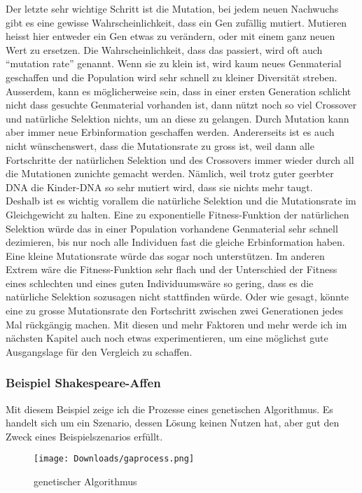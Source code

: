 \documentclass[10pt,a4paper,ngerman,english]{article}
\begin{document}
Der letzte sehr wichtige Schritt ist die Mutation, bei jedem neuen Nachwuchs gibt es eine gewisse Wahrscheinlichkeit, dass ein Gen zufällig mutiert. Mutieren heisst hier entweder ein Gen etwas zu verändern, oder mit einem ganz neuen Wert zu ersetzen. Die Wahrscheinlichkeit, dass das passiert, wird oft auch \enquote{mutation rate} genannt. Wenn sie zu klein ist, wird kaum neues Genmaterial geschaffen und die Population wird sehr schnell zu kleiner Diversität streben. Ausserdem, kann es möglicherweise sein, dass in einer ersten Generation schlicht nicht dass gesuchte Genmaterial vorhanden ist, dann nützt noch so viel Crossover und natürliche Selektion nichts, um an diese zu gelangen. Durch Mutation kann aber immer neue Erbinformation geschaffen werden. Andererseits ist es auch nicht wünschenswert, dass die Mutationsrate zu gross ist, weil dann alle Fortschritte der natürlichen Selektion und des Crossovers immer wieder durch all die Mutationen zunichte gemacht werden. Nämlich, weil trotz guter geerbter DNA die Kinder-DNA so sehr mutiert wird, dass sie nichts mehr taugt.\\

Deshalb ist es wichtig vorallem die natürliche Selektion und die Mutationsrate im Gleichgewicht zu halten. Eine zu exponentielle Fitness-Funktion der natürlichen Selektion würde das in einer Population vorhandene Genmaterial sehr schnell dezimieren, bis nur noch alle Individuen fast die gleiche Erbinformation haben. Eine kleine Mutationsrate würde das sogar noch unterstützen. Im anderen Extrem wäre die Fitness-Funktion sehr flach und der Unterschied der Fitness eines schlechten und eines guten Individuumswäre so gering, dass es die natürliche Selektion sozusagen nicht stattfinden würde. Oder wie gesagt, könnte eine zu grosse Mutationsrate den Fortschritt zwischen zwei Generationen jedes Mal rückgängig machen. Mit diesen und mehr Faktoren und mehr werde ich im nächsten Kapitel auch noch etwas experimentieren, um eine möglichst gute Ausgangslage für den Vergleich zu schaffen.

\subsubsection{Beispiel Shakespeare-Affen}

Mit diesem Beispiel zeige ich die Prozesse eines genetischen Algorithmus. Es handelt sich um ein Szenario, dessen Lösung keinen Nutzen hat, aber gut den Zweck eines Beispielszenarios erfüllt.

\begin{wrapfigure}[18]{l}{0.3\textwidth} 
    \vspace{-20pt}
        \begin{center}
            \texttt{[image: Downloads/gaprocess.png]}
            \caption{genetischer Algorithmus}
        \end{center}
    \vspace{-20pt}
\end{wrapfigure} 
\end{document}
